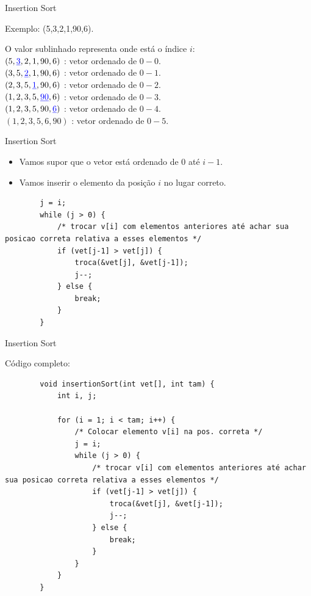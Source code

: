 \documentclass[handout]{beamer}
\begin{document}
\begin{frame}[fragile]{Insertion Sort}

    Exemplo: (5,3,2,1,90,6).

    O valor sublinhado representa onde está o índice $i$:\\
    $(5,{\color{blue}\underline{3}},2,1,90,6)$ : vetor ordenado de $0-0$.\\
    $(3,5,{\color{blue}\underline{2}},1,90,6)$ : vetor ordenado de $0-1$.\\
    $(2,3,5,{\color{blue}\underline{1}},90,6)$ : vetor ordenado de $0-2$.\\
    $(1,2,3,5,{\color{blue}\underline{90}},6)$ : vetor ordenado de $0-3$.\\
    $(1,2,3,5,90,{\color{blue}\underline{6}})$ : vetor ordenado de $0-4$.\\
    $(1,2,3,5,6,90)$ : vetor ordenado de $0-5$.

\end{frame}

\begin{frame}[fragile]{Insertion Sort}

    \begin{itemize}
        \item Vamos supor que o vetor está ordenado de $0$ até $i-1$.
        \item Vamos inserir o elemento da posição $i$ no lugar correto.
    \end{itemize}

    \begin{verbatim}
        j = i;
        while (j > 0) {
            /* trocar v[i] com elementos anteriores até achar sua posicao correta relativa a esses elementos */
            if (vet[j-1] > vet[j]) {
                troca(&vet[j], &vet[j-1]);
                j--;
            } else {
                break;
            }
        }
    \end{verbatim}

\end{frame}

\begin{frame}[fragile]{Insertion Sort}

    Código completo:
    \vspace{-1em}
    \begin{verbatim}
        void insertionSort(int vet[], int tam) {
            int i, j;

            for (i = 1; i < tam; i++) {
                /* Colocar elemento v[i] na pos. correta */
                j = i;
                while (j > 0) {
                    /* trocar v[i] com elementos anteriores até achar sua posicao correta relativa a esses elementos */
                    if (vet[j-1] > vet[j]) {
                        troca(&vet[j], &vet[j-1]);
                        j--;
                    } else {
                        break;
                    }
                }
            }
        }
    \end{verbatim}

\end{frame}
\end{document}
